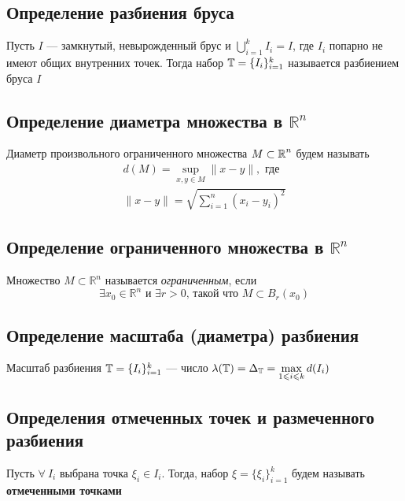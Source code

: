 \documentclass[a4paper]{article}
\begin{document}
\subsection{Определение разбиения бруса}
 Пусть $I$ — замкнутый, невырожденный брус и $\displaystyle\bigcup_{i=1}^kI_i = I$, где $I_i$ попарно не имеют общих внутренних точек. Тогда набор $\operatorname{\mathbb{T}} = \{I_i\}_{i=1}^k$ называется разбиением бруса $I$

\subsection{Определение диаметра множества в $\mathbb{R}^n$}
 Диаметр произвольного ограниченного множества $M\subset\operatorname{\mathbb{R}}^n$ будем называть 
\begin{equation*}
\begin{aligned}
    d(M) = \displaystyle\sup_{x,y\in M}\|x-y\|,\text{ где}\\
    \|x-y\|=\sqrt{\sum_{i=1}^{n}\left(x_i-y_i\right)^2}
\end{aligned}
\end{equation*}

\begin{center}
    
\end{center}

\subsection{Определение ограниченного множества в $\mathbb{R}^n$}
 Множество $M\subset \mathbb{R}^n$ называется \textit{ограниченным}, если $$\exists x_0\in\mathbb{R}^n\text{ и }\exists r>0\text{, такой что }M\subset B_{r}(x_0)$$

\subsection{Определение масштаба (диаметра) разбиения}
 Масштаб разбиения $\operatorname{\mathbb{T}}=\{I_i\}_{i=1}^k$ — число $\lambda(\operatorname{\mathbb{T}}) = \Delta_{\operatorname{\mathbb{T}}} = \displaystyle\max_{1\leqslant i\leqslant k} d(I_i)$

\subsection{Определения отмеченных точек и размеченного разбиения}
 Пусть $\forall\ I_i$ выбрана точка $\xi_i\in I_i$. Тогда, набор $\xi = \{\xi_i\}_{i=1}^k$ будем называть \textbf{отмеченными точками}
\end{document}
